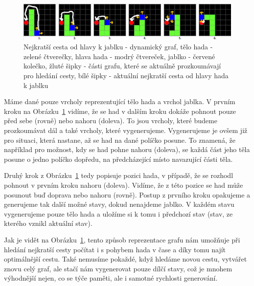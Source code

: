 \begin{figure}[h]
    \centering
    \includegraphics[width=\linewidth]{Images/DynamicGraphRepresentation.png}
    \caption{Nejkratší cesta od hlavy k jablku - dynamický graf, tělo hada - zelené čtverečky, hlava hada - modrý čtvereček, jablko - červené kolečko, žluté šipky - části grafu, které se aktuálně prozkoumávají pro hledání cesty, bílé šipky - aktuální nejkratší cesta od hlavy hada k jablku}
    \label{fig:DynamicGraphRepresentation}
\end{figure}

Máme dané pouze vrcholy reprezentující tělo hada a vrchol jablka. V prvním kroku na Obrázku~\ref{fig:DynamicGraphRepresentation} vidíme, že se had v dalším kroku dokáže pohnout pouze před sebe (rovně) nebo nahoru (doleva). To jsou vrcholy, které budeme prozkoumávat dál a také vrcholy, které vygenerujeme. Vygenerujeme je ovšem již pro situaci, která nastane, až se had na dané políčko posune. To znamená, že například pro možnost, kdy se had pohne nahoru (doleva), se každá část jeho těla posune o jedno políčko dopředu, na předcházející místo navazující části těla.

Druhý krok z Obrázku~\ref{fig:DynamicGraphRepresentation} tedy popisuje pozici hada, v případě, že se rozhodl pohnout v prvním kroku nahoru (doleva). Vidíme, že z této pozice se had může posunout buď doprava nebo nahoru (rovně). Postup z prvního kroku opakujeme a generujeme tak další možné stavy, dokud nenajdeme jablko. V každém stavu vygenerujeme pouze tělo hada a uložíme si k tomu i předchozí stav (stav, ze kterého vznikl aktuální stav).

Jak je vidět na Obrázku~\ref{fig:DynamicGraphRepresentation}, tento způsob reprezentace grafu nám umožňuje při hledání nejkratší cesty počítat i s pohybem hada v čase a díky tomu najít optimálnější cestu. Také nemusíme pokaždé, když hledáme novou cestu, vytvářet znovu celý graf, ale stačí nám vygenerovat pouze dílčí stavy, což je mnohem výhodnější nejen, co se týče paměti, ale i samotné rychlosti generování.